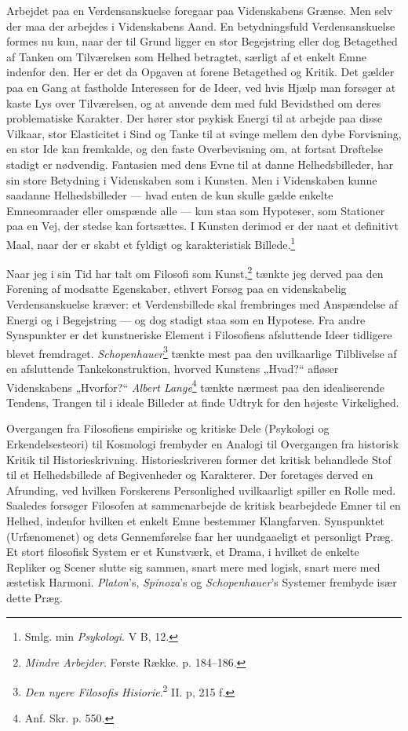 \documentclass[12pt,a4paper]{book}
\newcommand{\opage}[1]{\marginnote{\footnotesize\textit{[#1]}}}
\newcommand{\apage}[1]{\marginnote{\footnotesize\textit{[#1]}}}
\begin{document}
Arbejdet paa en Verdensanskuelse foregaar paa Videnskabens Grænse. Men selv der maa der
arbejdes i Videnskabens Aand. En betydningsfuld Verdensanskuelse formes nu kun, naar der
til Grund ligger en stor Begejstring eller dog Betagethed af Tanken om Tilværelsen som
Helhed betragtet, særligt af et enkelt Emne indenfor den. Her er det da Opgaven at
forene Betagethed og Kritik. Det gælder paa en Gang at fastholde Interessen for de
Ideer, ved hvis Hjælp man forsøger at kaste Lys over Tilværelsen, og at anvende dem med
fuld Bevidsthed om deres problematiske Karakter. Der hører stor psykisk Energi til at
arbejde paa disse Vilkaar, stor Elasticitet i Sind og Tanke til at svinge mellem den
dybe Forvisning, en stor Ide kan fremkalde, og den faste \opage{314} Overbevisning om, at fortsat
Drøftelse stadigt er nødvendig. Fantasien med dens Evne til at danne Helhedsbilleder,
har sin store Betydning i Videnskaben som i Kunsten. Men i Videnskaben kunne saadanne
Helhedsbilleder --- hvad enten de kun skulle gælde enkelte Emneomraader eller omspænde
alle --- kun staa som Hypoteser, som Stationer paa en Vej, der stedse kan fortsættes. I
Kunsten derimod er der naat et definitivt Maal, naar der er skabt et fyldigt og
karakteristisk Billede.\footnote{Smlg. min \emph{Psykologi}. V B, 12.}

Naar jeg i sin Tid har talt om Filosofi som Kunst,\footnote{\emph{Mindre Arbejder}.
Første Række. p. 184--186.} tænkte jeg derved paa den Forening af modsatte Egenskaber,
ethvert Forsøg paa en videnskabelig Verdensanskuelse kræver: et Verdensbillede skal frembringes med Anspændelse af Energi og i Begejstring --- og dog stadigt staa som en
Hypotese. Fra andre Synspunkter er det kunstneriske Element i Filosofiens afsluttende
Ideer tidligere blevet fremdraget. \emph{Schopenhauer}\footnote{\emph{Den nyere
Filosofis Hisiorie}.\textsuperscript{2} II. p, 215 f.} tænkte mest paa den uvilkaarlige
Tilblivelse af en afsluttende Tankekonstruktion, hvorved Kunstens „Hvad?“ afløser
Videnskabens „Hvorfor?“ \emph{Albert Lange}\footnote{Anf. Skr. p. 550.} tænkte nærmest
paa den idealiserende Tendens, Trangen til i ideale Billeder at finde Udtryk for den
højeste Virkelighed.

Overgangen fra Filosofiens empiriske og kritiske Dele (Psykologi og Erkendelsesteori)
til Kosmologi frembyder en Analogi til Overgangen fra historisk Kritik til
Historieskrivning. Historieskriveren former det kritisk behandlede Stof til et
Helhedsbillede af Begivenheder og Karakterer. Der foretages derved en Afrunding, ved
hvilken Forskerens Personlighed uvilkaarligt spiller en Rolle med. Saaledes forsøger
Filosofen at sammenarbejde de kritisk bearbejdede Emner til en Helhed, indenfor hvilken
et enkelt Emne bestemmer Klangfarven. Synspunktet (Urfænomenet) og dets Gennemførelse
faar her uundgaaeligt et personligt Præg. Et stort filosofisk System er et Kunstværk, et
Drama, i hvilket de enkelte Repliker og Scener slutte sig sammen, snart mere \apage{315} med logisk,
snart mere med æstetisk Harmoni. \emph{Platon}'s, \emph{Spinoza}'s og
\emph{Schopenhauer}'s Systemer frembyde især dette Præg.
\end{document}
